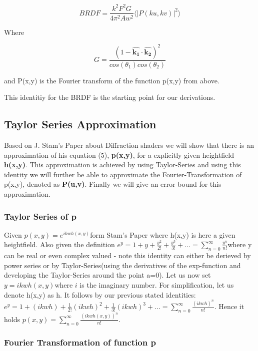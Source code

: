 \begin{equation}
    BRDF = \frac{k^2 F^2 G}{4\pi^2 A w^2} \langle \left|P(ku, kv)\right|^2\rangle
\end{equation}

Where 

\begin{equation}
    G = \frac{(1-\hat{\mathbf{k_1}}\cdot\hat{\mathbf{k_2}})^2}{cos(\theta_1)cos(\theta_2)}
\end{equation}

and P(x,y) is the Fourier transform of the function p(x,y) from above.

This identitiy for the BRDF is the starting point for our derivations.
 
\subsection{Taylor Series Approximation}

Based on J. Stam's Paper about Diffraction shaders we will show that
there is an approximation of his equation (5), \textbf{p(x,y)}, for
a explicitly given heightfield \textbf{h(x,y)}. This approximation
is achieved by using Taylor-Series and using this identity we will
further be able to approximate the Fourier-Transformation of p(x,y),
denoted as \textbf{P(u,v)}. Finally we will give an error bound for
this approximation.

\subsubsection{Taylor Series of p}

Given $p(x,y)=e^{ikwh(x,y)}$form Stam's Paper where h(x,y) is here
a given heightfield. Also given the definition $e^{y}=1+y+\frac{y^{2}}{2!}+\frac{y^{3}}{3!}+...=\sum_{n=0}^{\infty}\frac{y^{n}}{n!}$where
y can be real or even complex valued - note this identity can either
be derieved by power series or by Taylor-Series(using the derivatives
of the exp-function and developing the Taylor-Series around the point
a=0). Let us now set $y=ikwh(x,y)$where $i$ is the imaginary number.
For simplification, let us denote h(x,y) as h. It follows by our previous
stated identities: $e^{y}=1+(ikwh)+\frac{1}{2!}(ikwh)^{2}+\frac{1}{3!}(ikwh)^{3}+...=\sum_{n=0}^{\infty}\frac{(ikwh)^{n}}{n!}$.
Hence it holds $p(x,y)=\sum_{n=0}^{\infty}\frac{(ikwh(x,y))^{n}}{n!}.$


\subsubsection{Fourier Transformation of function p}

